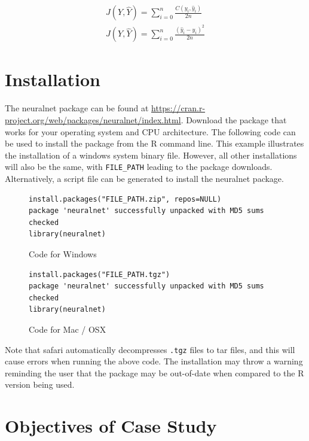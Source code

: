 \begin{gather*}
J(Y,\hat Y)=\sum_{i=0}^{n} \frac{C(y_i,\hat y_i)}{2n} \\
J(Y,\hat Y)=\sum_{i=0}^{n} \frac{(\hat y_i - y_i)^2}{2n}
\end{gather*}

\section{Installation}

The neuralnet package can be found at \url{https://cran.r-project.org/web/packages/neuralnet/index.html}.
Download the package that works for your operating system and CPU architecture.
The following code can be used to install the package from the R command line.
This example illustrates the installation of a windows system binary file.
However, all other installations will also be the same, with \texttt{FILE\_PATH} leading to the package downloads.
Alternatively, a script file can be generated to install the neuralnet package. 
\begin{figure}[htbp!]
\caption{Code for Windows}
\begin{lstlisting}
install.packages("FILE_PATH.zip", repos=NULL)
package 'neuralnet' successfully unpacked with MD5 sums checked
library(neuralnet)
\end{lstlisting}
\end{figure}

\begin{figure}[htbp!]
\caption{Code for Mac / OSX}
\begin{lstlisting}
install.packages("FILE_PATH.tgz")
package 'neuralnet' successfully unpacked with MD5 sums checked
library(neuralnet)
\end{lstlisting}
\end{figure}

Note that safari automatically decompresses \texttt{.tgz} files to tar files, and this will cause errors when running the above code.
The installation may throw a warning reminding the user that the package may be out-of-date when compared to the R version being used. 

\section{Objectives of Case Study}

